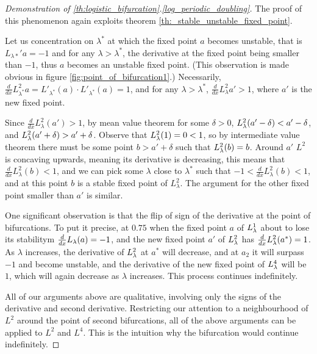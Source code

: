 \begin{proof}[Demonstration of \ref{th:logistic_bifurcation}.\ref{log_periodic_doubling}]
	The proof of this phenomenon again exploits theorem \ref{th:_stable_unstable_fixed_point}.

	Let us concentration on $\lambda^*$ at which the fixed point $a$ becomes unstable, that is $L_{\lambda*}' a  = - 1$ and for any $\lambda > \lambda^*$, the derivative at the fixed point being smaller than $-1$, thus $a$ becomes an unstable fixed point. (This observation is made obvious in figure \ref{fig:point_of_bifurcation1}.)
	Necessarily, $\frac{d}{dx}L_{\lambda^*}^2 a = L'_{\lambda^*}(a) \cdot L'_{\lambda^*}(a) = 1$,
	and for any $\lambda > \lambda^*$, $\frac{d}{dx}L_{\lambda}^2a'> 1$, where $a'$ is the new fixed point.

	Since $\frac{d}{dx}L_{\lambda}^2(a') > 1$, by mean value theorem for some $\delta > 0$, $L_{\lambda}^2(a' - \delta) < a' - \delta$, and $L_{\lambda}^2(a' + \delta) > a' + \delta$. 
	Observe that $L_{\lambda}^2(1) = 0 < 1$, so by intermediate value theorem there must be some point $b > a' + \delta$ such that $L_{\lambda}^2(b) = b$. 
	Around $a'$ $L^2$ is concaving upwards, meaning its derivative is decreasing, this means that $\frac{d}{dx }L_{\lambda}^2(b) < 1$,
	and we can pick some $\lambda$  close to $\lambda ^*$ such that $-1<\frac{d}{dx }L_{\lambda}^2(b) < 1$, and at this point $b$ is a stable fixed point of $L_{\lambda}^2$.
	The argument for the other fixed point smaller than $a'$ is similar. 

	One significant observation is that the flip of sign of the derivative at the point of bifurcations. 
	To put it precise, at $0.75$ when the fixed point $a$ of $L_{\lambda}^1$ about to lose its stabilitym $\frac{d}{dx} L_{\lambda}(a) = - 1$, and the new fixed point $a'$ of $L_{\lambda}^2$ has $\frac{d}{dx} L_{\lambda}^2(a^*) = 1$. 
	As $\lambda$ increases, the derivative of $L_{\lambda}^2$ at $a^*$ will decrease, and at $a_2$ it will surpass $-1$ and become unstable, and the derivative of the new fixed point of $L_{\lambda}^4$ will be $1$, which will again decrease as $\lambda$ increases.
	This process continues indefinitely.

	All of our arguments above are qualitative, involving only the signs of the derivative and second derivative. 
	Restricting our attention to a neighbourhood of $L^2$ around the point of second bifurcations, all of the above arguments can be applied to $L^2$ and $L^4$. 
	This is the intuition why the bifurcation would continue indefinitely.
	

\end{proof}
